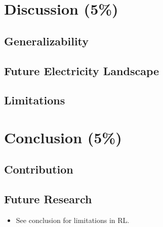 \documentclass[12pt, article]{article}
\begin{document}
\section{Discussion (5\%)}
\label{sec:orgd6eed87}
\subsection{Generalizability}
\label{sec:orgdb55f73}
\subsection{Future Electricity Landscape}
\label{sec:org12a4269}
\subsection{Limitations}
\label{sec:org5b1d8fa}
\section{Conclusion (5\%)}
\label{sec:orgabaaa83}
\subsection{Contribution}
\label{sec:org9c41fa0}
\subsection{Future Research}
\label{sec:org9d766c2}



\clearpage
\printbibliography

\begin{itemize}
\item See \parencite{vazquez-canteli19_reinf_learn_deman_respon} conclusion for
limitations in RL.
\end{itemize}
\end{document}
